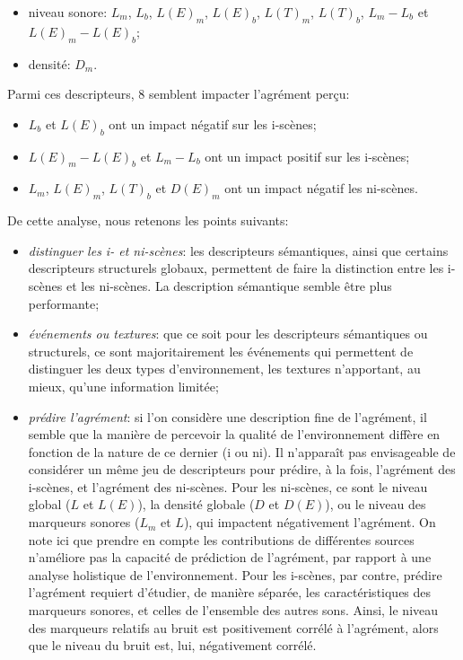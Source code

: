 \begin{itemize}
\item niveau sonore: $L_m$, $L_{b}$, $L(E)_{m}$, $L(E)_{b}$, $L(T)_{m}$, $L(T)_{b}$, $L_{m}-L_{b}$ et $L(E)_{m}-L(E)_{b}$;
\item densité: $D_{m}$.
\end{itemize}

Parmi ces descripteurs, 8 semblent impacter l'agrément perçu: 

\begin{itemize}
\item $L_b$ et $L(E)_b$ ont un impact négatif sur les i-scènes;
\item $L(E)_m-L(E)_b$ et $L_m-L_b$ ont un impact positif sur les i-scènes;
\item $L_m$, $L(E)_m$, $L(T)_b$ et $D(E)_m$ ont un impact négatif les ni-scènes.
\end{itemize}

De cette analyse, nous retenons les points suivants:

\begin{itemize}
\item \emph{distinguer les i- et ni-scènes}: les descripteurs sémantiques, ainsi que certains descripteurs structurels globaux, permettent de faire la distinction entre les i-scènes et les ni-scènes. La description sémantique semble être plus performante;
\item \emph{événements ou textures}: que ce soit pour les descripteurs sémantiques ou structurels, ce sont majoritairement les événements qui permettent de distinguer les deux types d'environnement, les textures n'apportant, au mieux, qu'une information limitée;
\item \emph{prédire l'agrément}: si l'on considère une description fine de l'agrément, il semble que la manière de percevoir la qualité de l'environnement diffère en fonction de la nature de ce dernier (i ou ni). Il n'apparaît pas envisageable de considérer un même jeu de descripteurs pour prédire, à la fois, l'agrément des i-scènes, et l'agrément des ni-scènes. Pour les ni-scènes, ce sont le niveau global ($L$ et $L(E)$), la densité globale ($D$ et $D(E)$), ou le niveau des marqueurs sonores ($L_m$ et $L$), qui impactent négativement l'agrément. On note ici que prendre en compte les contributions de différentes sources n'améliore pas la capacité de prédiction de l'agrément, par rapport à une analyse holistique de l'environnement. Pour les i-scènes, par contre, prédire l'agrément requiert d'étudier, de manière séparée, les caractéristiques des marqueurs sonores, et celles de l'ensemble des autres sons. Ainsi, le niveau des marqueurs relatifs au bruit est positivement corrélé à l'agrément, alors que le niveau du bruit est, lui, négativement corrélé.  
\end{itemize}

